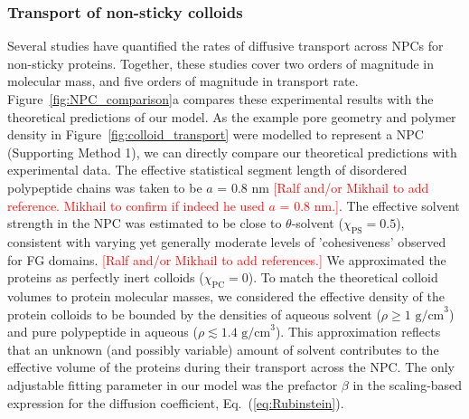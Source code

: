 \documentclass[12pt, a4paper]{article}
\newcommand\todo[1]{\textcolor{red}{#1}}
\begin{document}
\subsubsection{Transport of non-sticky colloids}

Several studies \cite{Ribbeck2001, Mohr2009, Popken2015, Timney2016, Frey2018} have quantified the rates of diffusive transport across NPCs for non-sticky proteins.
Together, these studies cover two orders of magnitude in molecular mass, and five orders of magnitude in transport rate. 
Figure~\ref{fig:NPC_comparison}a compares these experimental results with the theoretical predictions of our model.
As the example pore geometry and polymer density in Figure~\ref{fig:colloid_transport} were modelled to represent a NPC (Supporting Method 1), we can directly compare our theoretical predictions with experimental data.
The effective statistical segment length of disordered polypeptide chains was taken to be $a$ = 0.8 nm \todo{[Ralf and/or Mikhail to add reference. Mikhail to confirm if indeed he used $a$ = 0.8 nm.]}.
The effective solvent strength in the NPC was estimated to be close to $\theta$-solvent ($\chi_{\text{PS}} = 0.5$), consistent with varying yet generally moderate levels of 'cohesiveness' observed for FG domains. \todo{[Ralf and/or Mikhail to add references.]}
We approximated the proteins as perfectly inert colloids ($\chi_{\text{PC}} = 0$).
To match the theoretical colloid volumes to protein molecular masses, we considered the effective density of the protein colloids to be bounded by the densities of aqueous solvent ($\rho \geq \text{1 g/cm}^3$) and pure polypeptide in aqueous ($\rho \lesssim \text{1.4 g/cm}^3$).
This approximation reflects that an unknown (and possibly variable) amount of solvent contributes to the effective volume of the proteins during their transport across the NPC.
The only adjustable fitting parameter in our model was the prefactor $\beta$ in the scaling-based expression for the diffusion coefficient, Eq.~(\ref{eq:Rubinstein}).
\end{document}
